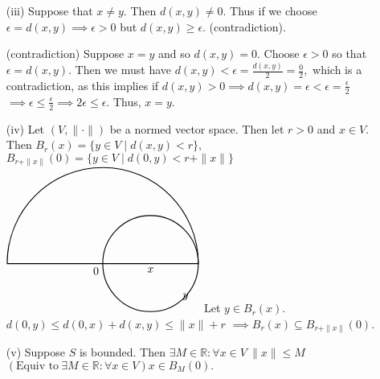 \documentclass{article}
\theoremstyle{definition}
\numberwithin{equation}{section}
\begin{document}
\begin{enumerate}
    \item[(iii)] Suppose that $x \neq y$. Then $d(x,y) \neq 0$. Thus if we choose $\epsilon = d(x,y) \implies \epsilon > 0$ but $d(x,y) \geq \epsilon$. (contradiction).

    (contradiction) Suppose $x=y$ and so $d(x,y) = 0$. Choose $\epsilon > 0$ so that $\epsilon = d(x,y)$. Then we must have 
    $
    d(x,y) < \epsilon = \frac{d(x,y)}{2} = \frac{0}{2},
    $
    which is a contradiction, as this implies if $d(x,y) > 0 \implies d(x,y) = \epsilon < \epsilon = \frac{\epsilon}{2}$
    $
    \implies \epsilon \leq \frac{\epsilon}{2} \implies 2 \epsilon \leq \epsilon.
    $
    Thus, $x = y$.

    \item[(iv)] Let $(V, \| \cdot \|)$ be a normed vector space. Then let $r > 0$ and $x \in V$. Then
    $
    B_r(x) = \{ y \in V \mid d(x,y) < r \},
    $
    $
    B_{r + \| x \|}(0) = \{ y \in V \mid d(0,y) < r + \| x \| \}
    $
    $
    \begin{tikzpicture}
    \draw[thick] (0,0) -- (3,0) arc[start angle=0,end angle=180,radius=3cm] -- cycle;
    \draw[thick] (1.5,0) circle (1.5cm);
    \node[below left] at (0,0) {$0$};
    \node[below] at (1.5,0) {$x$};
    \node[below] at (2.6,-0.8) {$y$};
    \end{tikzpicture}
    $
    Let $y \in B_r(x)$. 
    $
    d(0,y) \leq d(0,x) + d(x,y) \leq \| x \| + r
    $
    $
    \implies B_r(x) \subseteq B_{r + \| x \|}(0).
    $

    \item[(v)] Suppose $S$ is bounded. Then $\exists M \in \mathbb{R}: \forall x \in V \ \| x \| \leq M$
    $
    (\text{Equiv to}\ \exists M \in \mathbb{R}: \forall x \in V) x \in B_M(0).
    $
\end{enumerate}
\end{document}
